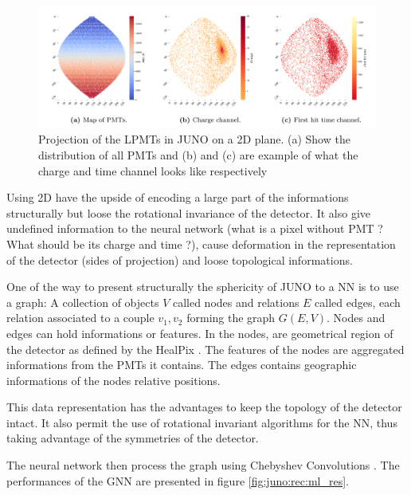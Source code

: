 \begin{figure}[ht]
  \centering
  \includegraphics[width=\linewidth]{images/juno/reco/cnn_proj.png}
  \caption{Projection of the LPMTs in JUNO on a 2D plane. (a) Show the distribution of all PMTs and (b) and (c) are example of what the charge and time channel looks like respectively}
  \label{fig:juno:rec:cnn_proj}
\end{figure}

Using 2D have the upside of encoding a large part of the informations structurally but loose the rotational invariance of the detector. It also give undefined information to the neural network (what is a pixel without PMT ? What should be its charge and time ?), cause deformation in the representation of the detector (sides of projection) and loose topological informations.

One of the way to present structurally the sphericity of JUNO to a NN is to use a graph: A collection of objects $V$ called nodes and relations $E$ called edges, each relation associated to a couple ${v_1, v_2}$ forming the graph $G(E, V)$. Nodes and edges can hold informations or features. In \cite{qian_vertex_2021} the nodes, are geometrical region of the detector as defined by the HealPix \cite{gorski_healpix_2005-1}. The features of the nodes are aggregated informations from the PMTs it contains. The edges contains geographic informations of the nodes relative positions.

This data representation has the advantages to keep the topology of the detector intact. It also permit the use of rotational invariant algorithms for the NN, thus taking advantage of the symmetries of the detector.

The neural network then process the graph using Chebyshev Convolutions \cite{defferrard_convolutional_2017}. The performances of the GNN are presented in figure \ref{fig:juno:rec:ml_res}.



